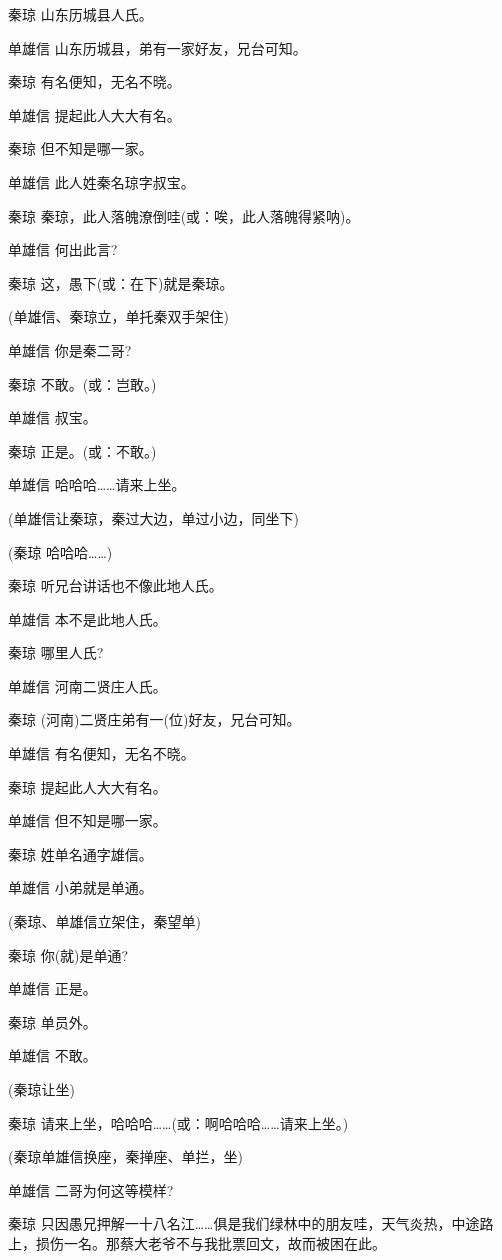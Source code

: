 秦琼 山东历城县人氏。

单雄信 山东历城县，弟有一家好友，兄台可知。

秦琼 有名便知，无名不晓。

单雄信 提起此人大大有名。

秦琼 但不知是哪一家。

单雄信 此人姓秦名琼字叔宝。

秦琼 秦琼，此人落魄潦倒哇(或：唉，此人落魄得紧呐)。

单雄信 何出此言?

秦琼 这，愚下(或：在下)就是秦琼。

(单雄信、秦琼立，单托秦双手架住)

单雄信 你是秦二哥?

秦琼 不敢。(或：岂敢。)

单雄信 叔宝。

秦琼 正是。(或：不敢。)

单雄信 哈哈哈\ldots{}\ldots{}请来上坐。

(单雄信让秦琼，秦过大边，单过小边，同坐下)

(秦琼 哈哈哈\ldots{}\ldots{})

秦琼 听兄台讲话也不像此地人氏。

单雄信 本不是此地人氏。

秦琼 哪里人氏?

单雄信 河南二贤庄人氏。

秦琼 (河南)二贤庄弟有一(位)好友，兄台可知。

单雄信 有名便知，无名不晓。

秦琼 提起此人大大有名。

单雄信 但不知是哪一家。

秦琼 姓单名通字雄信。

单雄信 小弟就是单通。

(秦琼、单雄信立架住，秦望单)

秦琼 你(就)是单通?

单雄信 正是。

秦琼 单员外。

单雄信 不敢。

(秦琼让坐)

秦琼
请来上坐，哈哈哈\ldots{}\ldots{}(或：啊哈哈哈\ldots{}\ldots{}请来上坐。)

(秦琼单雄信换座，秦掸座、单拦，坐)

单雄信 二哥为何这等模样?

秦琼
只因愚兄押解一十八名江\ldots{}\ldots{}俱是我们绿林中的朋友哇，天气炎热，中途路上，损伤一名。那蔡大老爷不与我批票回文，故而被困在此。

